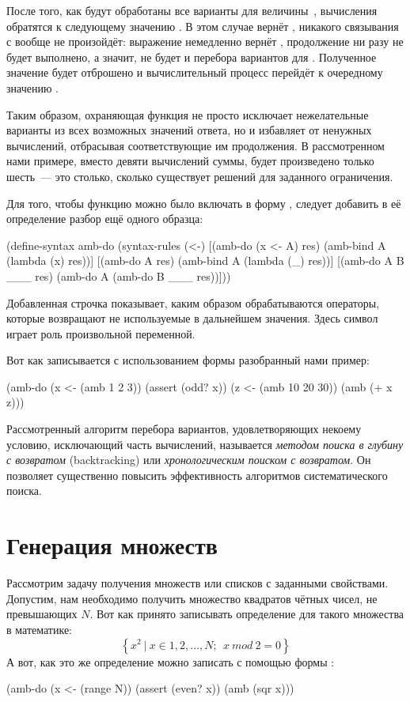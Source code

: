 После того, как будут обработаны все варианты для величины~, вычисления обратятся к следующему значению . В этом случае  вернёт , никакого связывания с  вообще не произойдёт: выражение  немедленно вернёт , продолжение  ни разу не будет выполнено, а значит, не будет и перебора вариантов для . Полученное значение  будет отброшено и вычислительный процесс перейдёт к очередному значению .

Таким образом, охраняющая функция  не просто исключает нежелательные варианты из всех возможных значений ответа, но и избавляет от ненужных вычислений, отбрасывая соответствующие им продолжения. В рассмотренном нами примере, вместо девяти вычислений суммы, будет произведено только шесть~--- это столько, сколько существует решений для заданного ограничения.

Для того, чтобы функцию  можно было включать в форму , следует добавить в её определение разбор ещё одного образца:\newpage

\begin{Definition}[emph={x,A,res,B}]
(define-syntax amb-do
  (syntax-rules (<-) 
    [(amb-do (x <- A) res) (amb-bind A (lambda (x) res))]
    [(amb-do A res)        (amb-bind A (lambda (_) res))]
    [(amb-do A B ___ res)  (amb-do A (amb-do B ___ res))]))
\end{Definition}

Добавленная строчка показывает, каким образом обрабатываются операторы, которые возвращают не используемые в дальнейшем значения. Здесь символ \s{_} играет роль произвольной переменной.

Вот как записывается с использованием формы  разобранный нами пример:

\begin{SchemeCode}
(amb-do
  (x <- (amb 1 2 3))
  (assert (odd? x))
  (z <- (amb 10 20 30))
  (amb (+ x z)))
\end{SchemeCode}

Рассмотренный алгоритм перебора вариантов, удовлетворяющих некоему условию, исключающий часть вычислений, называется \emph{методом поиска в глубину с возвратом} (backtracking) или \emph{хронологическим поиском с возвратом}. Он позволяет существенно повысить эффективность алгоритмов систематического поиска.

\section[2]{Генерация множеств}%
Рассмотрим задачу получения множеств или списков с заданными свойствами. Допустим, нам необходимо получить множество квадратов чётных чисел, не превышающих $N$.  Вот как принято записывать определение для такого множества в математике:  $$\left\{ x^2~|~x \in {1, 2, ..., N};~~ x~mod~2 = 0 \right\}$$
А вот, как это же определение можно записать с помощью формы :
\begin{SchemeCode}[emph={x,N}]
  (amb-do
    (x <- (range N))
    (assert (even? x))
    (amb (sqr x)))
\end{SchemeCode}

